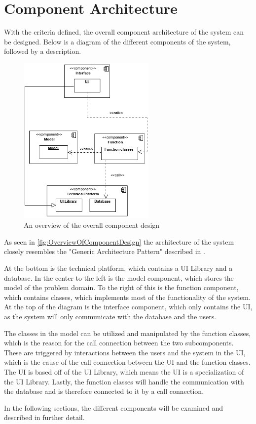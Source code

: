 \section{Component Architecture} \label{sc:component_architecture}
With the criteria defined, the overall component architecture of the system can be designed. Below is a diagram of the different components of the system, followed by a description.

\begin{figure}[H]
    \centering
    \includegraphics[width=0.6\textwidth]{figures/ComponentDiagrams/ComponentDesignOverview.png}
    \caption{An overview of the overall component design}
    \label{fig:OverviewOfComponentDesign}
\end{figure}
As seen in \autoref{fig:OverviewOfComponentDesign} the architecture of the system closely resembles the "Generic Architecture Pattern" described in \citep[p 198]{OOAD}.
\par
At the bottom is the technical platform, which contains a UI Library and a database. In the center to the left is the model component, which stores the model of the problem domain. To the right of this is the function component, which contains classes, which implements most of the functionality of the system. At the top of the diagram is the interface component, which only contains the UI, as the system will only communicate with the database and the users.
\par
The classes in the model can be utilized and manipulated by the function classes, which is the reason for the call connection between the two subcomponents. These are triggered by interactions between the users and the system in the UI, which is the cause of the call connection between the UI and the function classes. The UI is based off of the UI Library, which means the UI is a specialization of the UI Library. Lastly, the function classes will handle the communication with the database and is therefore connected to it by a call connection.
\par
In the following sections, the different components will be examined and described in further detail.
